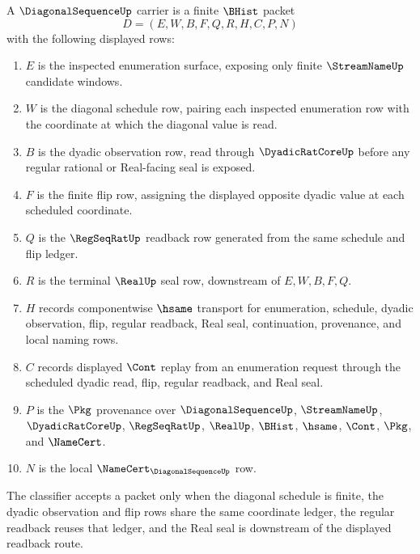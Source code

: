 \begin{definition}
\label{def:diagonal-sequence-carrier}
A $\DiagonalSequenceUp$ carrier is a finite $\BHist$ packet
$$
D=(E,W,B,F,Q,R,H,C,P,N)
$$
with the following displayed rows:
\begin{enumerate}
\item $E$ is the inspected enumeration surface, exposing only finite $\StreamNameUp$ candidate windows.
\item $W$ is the diagonal schedule row, pairing each inspected enumeration row with the coordinate at which the diagonal value is read.
\item $B$ is the dyadic observation row, read through $\DyadicRatCoreUp$ before any regular rational or Real-facing seal is exposed.
\item $F$ is the finite flip row, assigning the displayed opposite dyadic value at each scheduled coordinate.
\item $Q$ is the $\RegSeqRatUp$ readback row generated from the same schedule and flip ledger.
\item $R$ is the terminal $\RealUp$ seal row, downstream of $E,W,B,F,Q$.
\item $H$ records componentwise $\hsame$ transport for enumeration, schedule, dyadic observation, flip, regular readback, Real seal, continuation, provenance, and local naming rows.
\item $C$ records displayed $\Cont$ replay from an enumeration request through the scheduled dyadic read, flip, regular readback, and Real seal.
\item $P$ is the $\Pkg$ provenance over $\DiagonalSequenceUp$, $\StreamNameUp$, $\DyadicRatCoreUp$, $\RegSeqRatUp$, $\RealUp$, $\BHist$, $\hsame$, $\Cont$, $\Pkg$, and $\NameCert$.
\item $N$ is the local $\NameCert_{\DiagonalSequenceUp}$ row.
\end{enumerate}
The classifier accepts a packet only when the diagonal schedule is finite, the dyadic observation and flip rows share the same coordinate ledger, the regular readback reuses that ledger, and the Real seal is downstream of the displayed readback route.
\end{definition}

